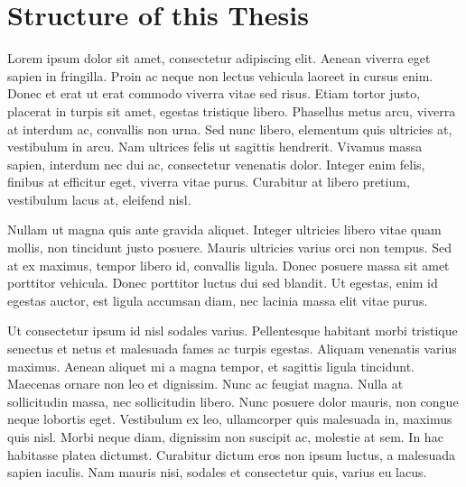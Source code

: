 \section{Structure of this Thesis}

Lorem ipsum dolor sit amet, consectetur adipiscing elit. Aenean viverra eget sapien in fringilla. Proin ac neque non lectus vehicula laoreet in cursus enim. Donec et erat ut erat commodo viverra vitae sed risus. Etiam tortor justo, placerat in turpis sit amet, egestas tristique libero. Phasellus metus arcu, viverra at interdum ac, convallis non urna. Sed nunc libero, elementum quis ultricies at, vestibulum in arcu. Nam ultrices felis ut sagittis hendrerit. Vivamus massa sapien, interdum nec dui ac, consectetur venenatis dolor. Integer enim felis, finibus at efficitur eget, viverra vitae purus. Curabitur at libero pretium, vestibulum lacus at, eleifend nisl.

Nullam ut magna quis ante gravida aliquet. Integer ultricies libero vitae quam mollis, non tincidunt justo posuere. Mauris ultricies varius orci non tempus. Sed at ex maximus, tempor libero id, convallis ligula. Donec posuere massa sit amet porttitor vehicula. Donec porttitor luctus dui sed blandit. Ut egestas, enim id egestas auctor, est ligula accumsan diam, nec lacinia massa elit vitae purus.

Ut consectetur ipsum id nisl sodales varius. Pellentesque habitant morbi tristique senectus et netus et malesuada fames ac turpis egestas. Aliquam venenatis varius maximus. Aenean aliquet mi a magna tempor, et sagittis ligula tincidunt. Maecenas ornare non leo et dignissim. Nunc ac feugiat magna. Nulla at sollicitudin massa, nec sollicitudin libero. Nunc posuere dolor mauris, non congue neque lobortis eget. Vestibulum ex leo, ullamcorper quis malesuada in, maximus quis nisl. Morbi neque diam, dignissim non suscipit ac, molestie at sem. In hac habitasse platea dictumst. Curabitur dictum eros non ipsum luctus, a malesuada sapien iaculis. Nam mauris nisi, sodales et consectetur quis, varius eu lacus.
